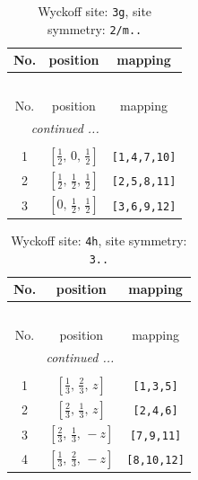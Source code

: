 \documentclass[fleqn,8pt]{jsarticle}
\begin{document}
\begin{longtable}{ccc}
\caption{Wyckoff site: {\tt 3g}, site symmetry: {\tt 2/m..}}
 \\
 \hline \hline
No. & position & mapping \\ \hline \endfirsthead

\multicolumn{2}{l}{\tablename\ \thetable{}} \\
 \hline \hline
No. & position & mapping \\ \hline \endhead

 \hline \hline
\multicolumn{2}{r}{\footnotesize\it continued ...} \\ \endfoot

 \hline \hline
\multicolumn{2}{r}{} \\ \endlastfoot

1 & $\left[ \frac{1}{2},\, 0,\, \frac{1}{2} \right]$ & {\tt [1,4,7,10]} \\ \hline
2 & $\left[ \frac{1}{2},\, \frac{1}{2},\, \frac{1}{2} \right]$ & {\tt [2,5,8,11]} \\ \hline
3 & $\left[ 0,\, \frac{1}{2},\, \frac{1}{2} \right]$ & {\tt [3,6,9,12]} \\
\end{longtable}
\renewcommand{\arraystretch}{1.2}
\begin{longtable}{ccc}
\caption{Wyckoff site: {\tt 4h}, site symmetry: {\tt 3..}}
 \\
 \hline \hline
No. & position & mapping \\ \hline \endfirsthead

\multicolumn{2}{l}{\tablename\ \thetable{}} \\
 \hline \hline
No. & position & mapping \\ \hline \endhead

 \hline \hline
\multicolumn{2}{r}{\footnotesize\it continued ...} \\ \endfoot

 \hline \hline
\multicolumn{2}{r}{} \\ \endlastfoot

1 & $\left[ \frac{1}{3},\, \frac{2}{3},\, z \right]$ & {\tt [1,3,5]} \\ \hline
2 & $\left[ \frac{2}{3},\, \frac{1}{3},\, z \right]$ & {\tt [2,4,6]} \\ \hline
3 & $\left[ \frac{2}{3},\, \frac{1}{3},\, - z \right]$ & {\tt [7,9,11]} \\ \hline
4 & $\left[ \frac{1}{3},\, \frac{2}{3},\, - z \right]$ & {\tt [8,10,12]} \\
\end{longtable}
\end{document}
